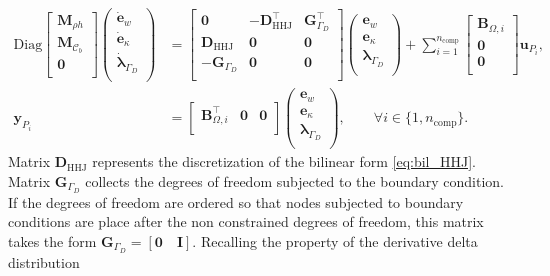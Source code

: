 \begin{equation}
\begin{aligned}
\mathrm{Diag}
\begin{bmatrix}
\mathbf{M}_{\rho h}\\
\mathbf{M}_{\bm{\mathcal{C}}_b}\\
\mathbf{0}\\
\end{bmatrix}
\begin{pmatrix}
\dot{\mathbf{e}}_{w} \\
\dot{\mathbf{e}}_{\kappa} \\
\dot{\bm{\lambda}}_{\Gamma_D} \\
\end{pmatrix}
&= \begin{bmatrix}
\mathbf{0} & - \mathbf{D}_{\mathrm{HHJ}}^\top & \mathbf{G}_{\Gamma_D}^\top\\
\mathbf{D}_{\mathrm{HHJ}} & \mathbf{0} & \mathbf{0}\\
-\mathbf{G}_{\Gamma_D} & \mathbf{0} & \mathbf{0}\\
\end{bmatrix} 
\begin{pmatrix}
{\mathbf{e}}_{w} \\
{\mathbf{e}}_{\kappa} \\
{\bm{\lambda}}_{\Gamma_D} \\
\end{pmatrix} + \sum_{i = 1}^{n_{\text{comp}}}
\begin{bmatrix}
\mathbf{B}_{\Omega, i} \\
\mathbf{0}\\
\mathbf{0}\\
\end{bmatrix}\mathbf{u}_{P_i}, \\
\mathbf{y}_{P_i}
&= \begin{bmatrix}
\mathbf{B}_{\Omega, i}^\top &  \mathbf{0} &  \mathbf{0} \\
\end{bmatrix}
\begin{pmatrix}
{\mathbf{e}}_{w} \\
{\mathbf{e}}_{\kappa} \\
{\bm{\lambda}}_{\Gamma_D} \\
\end{pmatrix}, \qquad \forall i \in \{1, n_{\text{comp}}\}.
\end{aligned}
\end{equation}
Matrix $\mathbf{D}_{\mathrm{HHJ}}$ represents the discretization of the bilinear form \eqref{eq:bil_HHJ}. Matrix $\mathbf{G}_{\Gamma_D}$ collects the degrees of freedom subjected to the boundary condition. If the degrees of freedom are ordered so that nodes subjected to boundary conditions are place after the non constrained degrees of freedom, this matrix takes the form $\mathbf{G}_{\Gamma_D}= [\mathbf{0} \quad \mathbf{I}]$. Recalling the property of the derivative delta distribution 
